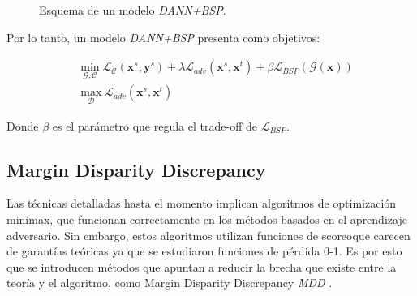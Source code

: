 \begin{figure}[H]

    \caption{Esquema de un modelo {\it DANN+BSP}.}
    \label{fig:bsp-esquema-dann}
\end{figure}

Por lo tanto, un modelo {\it DANN+BSP} presenta como objetivos:

\begin{align}
     & \min_{\mathcal{G},\mathcal{C}} \mathcal{L}_\mathcal{C}(\mathbf{x}^s, \mathbf{y}^s) + \lambda \mathcal{L}_{adv}(\mathbf{x}^s, \mathbf{x}^t) + \beta \mathcal{L}_{BSP}(\mathcal{G}(\mathbf{x})) \\
     & \max_{\mathcal{D}} \mathcal{L}_{adv}(\mathbf{x}^s, \mathbf{x}^t)
    \label{eq:bsp-dann-obejtivo}
\end{align}

Donde $\beta$ es el parámetro que regula el trade-off de $\mathcal{L}_{BSP}$.

\subsection{Margin Disparity Discrepancy}

Las técnicas detalladas hasta el momento implican algoritmos de optimización minimax, que funcionan correctamente en
los métodos basados en el aprendizaje adversario. Sin embargo, estos algoritmos utilizan funciones de scoreoque carecen
de garantías teóricas ya que se estudiaron funciones de pérdida 0-1. Es por esto que se introducen métodos que apuntan
a reducir la brecha que existe entre la teoría y el algoritmo, como Margin Disparity Discrepancy {\it MDD} \parencite{zhang2019bridging}.

